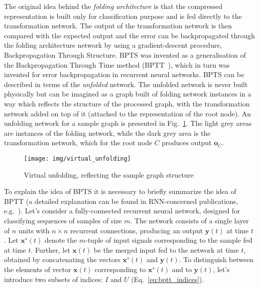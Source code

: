The original idea behind the \emph{folding architecture} is that the compressed representation is built only for classification purpose and is fed directly to the transformation network. The output of the transformation network is then compared with the expected output and the error can be backpropagated through the folding architecture network by using a gradient-descent procedure, Backpropagation Through Structure. BPTS was invented as a generalisation of the Backpropagation Through Time method (BPTT~\cite{pineda1987generalization}), which in turn was invented for error backpropagation in recurrent neural networks. BPTS can be described in terms of the \emph{unfolded} network. The unfolded network is never built physically but can be imagined as a graph built of folding network instances in a way which reflects the structure of the processed graph, with the transformation network added on top of it (attached to the representation of the root node). An unfolding network for a sample graph is presented in Fig.~\ref{fig:virtual_unfolding}. The light grey areas are instances of the folding network, while the dark grey area is the transformation network, which for the root node $C$ produces output $\bm{o}_C$.

\begin{figure}
\begin{center}
	\texttt{[image: img/virtual\_unfolding]}
	\caption{Virtual unfolding, reflecting the sample graph structure}
	\label{fig:virtual_unfolding}
\end{center}
\end{figure}

To explain the idea of BPTS it is necessary to briefly summarize the idea of BPTT (a detailed explanation can be found in RNN-concerned publications, e.g.~\cite{williams1995gradient}). Let's consider a fully-connected recurrent neural network, designed for classifying sequences of samples of size $m$. The network consists of a single layer of $n$ units with $n \times n$ recurrent connections, producing an output $\bm{y}(t)$ at time $t$. Let $\bm{x}^{s}(t)$ denote the $m$-tuple of input signals corresponding to the sample fed at time $t$. Further, let $\bm{x}(t)$ be the merged input fed to the network at time $t$, obtained by concatenating the vectors $\bm{x}^{s}(t)$ and $\bm{y}(t)$. To distinguish between the elements of vector $\bm{x}(t)$ corresponding to $\bm{x}^{s}(t)$ and to $\bm{y}(t)$, let's introduce two subsets of indices: $I$ and $U$ (Eq.~\ref{eq:bptt_indices}).

